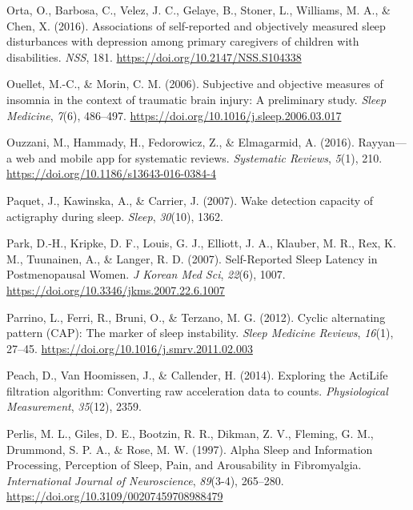 \documentclass[
]{article}
\newlength{\cslhangindent}
\newenvironment{CSLReferences}[2] %
 {\begin{list}{}{%
  \setlength{\itemindent}{0pt}
  \setlength{\leftmargin}{0pt}
  \setlength{\parsep}{0pt}
  \ifodd #1
   \setlength{\leftmargin}{\cslhangindent}
   \setlength{\itemindent}{-1\cslhangindent}
  \fi
  \setlength{\itemsep}{#2\baselineskip}}}
 {\end{list}}
\begin{document}
\begin{CSLReferences}{1}{0}
Orta, O., Barbosa, C., Velez, J. C., Gelaye, B., Stoner, L., Williams, M. A., \& Chen, X. (2016). Associations of self-reported and objectively measured sleep disturbances with depression among primary caregivers of children with disabilities. \emph{NSS}, 181. \url{https://doi.org/10.2147/NSS.S104338}

Ouellet, M.-C., \& Morin, C. M. (2006). Subjective and objective measures of insomnia in the context of traumatic brain injury: {A} preliminary study. \emph{Sleep Medicine}, \emph{7}(6), 486--497. \url{https://doi.org/10.1016/j.sleep.2006.03.017}

Ouzzani, M., Hammady, H., Fedorowicz, Z., \& Elmagarmid, A. (2016). Rayyan---a web and mobile app for systematic reviews. \emph{Systematic Reviews}, \emph{5}(1), 210. \url{https://doi.org/10.1186/s13643-016-0384-4}

Paquet, J., Kawinska, A., \& Carrier, J. (2007). Wake detection capacity of actigraphy during sleep. \emph{Sleep}, \emph{30}(10), 1362.

Park, D.-H., Kripke, D. F., Louis, G. J., Elliott, J. A., Klauber, M. R., Rex, K. M., Tuunainen, A., \& Langer, R. D. (2007). Self-{Reported} {Sleep} {Latency} in {Postmenopausal} {Women}. \emph{J Korean Med Sci}, \emph{22}(6), 1007. \url{https://doi.org/10.3346/jkms.2007.22.6.1007}

Parrino, L., Ferri, R., Bruni, O., \& Terzano, M. G. (2012). {Cyclic alternating pattern (CAP): The marker of sleep instability}. \emph{Sleep Medicine Reviews}, \emph{16}(1), 27--45. \url{https://doi.org/10.1016/j.smrv.2011.02.003}

Peach, D., Van Hoomissen, J., \& Callender, H. (2014). Exploring the ActiLife{\textregistered} filtration algorithm: Converting raw acceleration data to counts. \emph{Physiological Measurement}, \emph{35}(12), 2359.

Perlis, M. L., Giles, D. E., Bootzin, R. R., Dikman, Z. V., Fleming, G. M., Drummond, S. P. A., \& Rose, M. W. (1997). Alpha {Sleep} and {Information} {Processing}, {Perception} of {Sleep}, {Pain}, and {Arousability} in {Fibromyalgia}. \emph{International Journal of Neuroscience}, \emph{89}(3-4), 265--280. \url{https://doi.org/10.3109/00207459708988479}


\end{CSLReferences}
\end{document}
